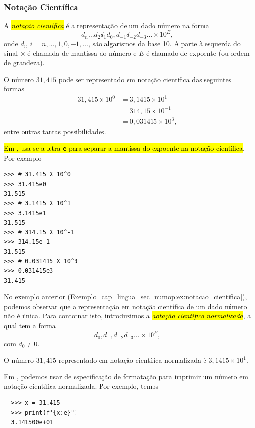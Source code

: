 \subsubsection{Notação Científica}

A \hl{\emph{notação científica}} é a representação de um dado número na forma
\begin{equation}
  d_{n}\ldots d_2d_1d_0,d_{-1}d_{-2}d_{-3}\ldots \times 10^{E},
\end{equation}
onde $d_i$, $i=n, \ldots, 1, 0, -1, \ldots$, são algarismos da base 10. A parte à esquerda do sinal $\times$ é chamada de mantissa do número e $E$ é chamado de expoente (ou ordem de grandeza).

\begin{ex}\label{cap_lingua_sec_numop:ex:notacao_cientifica}
  O número $31,415$ pode ser representado em notação científica das seguintes formas
  \begin{align}
    31,415\times 10^0 &= 3,1415\times 10^{1} \\
                      &= 314,15\times 10^{-1} \\
                      &= 0,031415\times 10^{3},
  \end{align}
  entre outras tantas possibilidades.

  \hl{Em {\python}, usa-se a letra \texttt{e} para separar a mantissa do expoente na notação científica}. Por exemplo

\begin{lstlisting}
>>> # 31.415 X 10^0
>>> 31.415e0
31.515
>>> # 3.1415 X 10^1
>>> 3.1415e1
31.515
>>> # 314.15 X 10^-1
>>> 314.15e-1
31.515
>>> # 0.031415 X 10^3
>>> 0.031415e3
31.415
\end{lstlisting}

\end{ex}

No exemplo anterior (Exemplo~\ref{cap_lingua_sec_numop:ex:notacao_cientifica}), podemos observar que a representação em notação científica de um dado número não é única. Para contornar isto, introduzimos a \hl{\emph{notação científica normalizada}}, a qual tem a forma
\begin{equation}
  d_0,d_{-1}d_{-2}d_{-3}\ldots\times 10^{E},
\end{equation}
com $d_0 \neq 0$.

\begin{ex}
  O número $31,415$ representado em notação científica normalizada é $3,1415\times 10^{1}$.

  Em {\python}, podemos usar de especificação de formatação para imprimir um número em notação científica normalizada. Por exemplo, temos

  \begin{lstlisting}
  >>> x = 31.415
  >>> print(f"{x:e}")
  3.141500e+01
  \end{lstlisting}

\end{ex}

